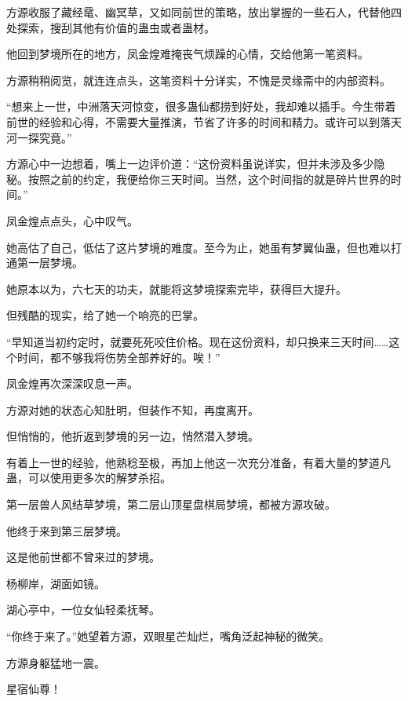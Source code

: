 \begin{this_body}
方源收服了藏经鼋、幽冥草，又如同前世的策略，放出掌握的一些石人，代替他四处探索，搜刮其他有价值的蛊虫或者蛊材。

他回到梦境所在的地方，凤金煌难掩丧气烦躁的心情，交给他第一笔资料。

方源稍稍阅览，就连连点头，这笔资料十分详实，不愧是灵缘斋中的内部资料。

“想来上一世，中洲落天河惊变，很多蛊仙都捞到好处，我却难以插手。今生带着前世的经验和心得，不需要大量推演，节省了许多的时间和精力。或许可以到落天河一探究竟。”

方源心中一边想着，嘴上一边评价道：“这份资料虽说详实，但并未涉及多少隐秘。按照之前的约定，我便给你三天时间。当然，这个时间指的就是碎片世界的时间。”

凤金煌点点头，心中叹气。

她高估了自己，低估了这片梦境的难度。至今为止，她虽有梦翼仙蛊，但也难以打通第一层梦境。

她原本以为，六七天的功夫，就能将这梦境探索完毕，获得巨大提升。

但残酷的现实，给了她一个响亮的巴掌。

“早知道当初约定时，就要死死咬住价格。现在这份资料，却只换来三天时间……这个时间，都不够我将伤势全部养好的。唉！”

凤金煌再次深深叹息一声。

方源对她的状态心知肚明，但装作不知，再度离开。

但悄悄的，他折返到梦境的另一边，悄然潜入梦境。

有着上一世的经验，他熟稔至极，再加上他这一次充分准备，有着大量的梦道凡蛊，可以使用更多次的解梦杀招。

第一层兽人风结草梦境，第二层山顶星盘棋局梦境，都被方源攻破。

他终于来到第三层梦境。

这是他前世都不曾来过的梦境。

杨柳岸，湖面如镜。

湖心亭中，一位女仙轻柔抚琴。

“你终于来了。”她望着方源，双眼星芒灿烂，嘴角泛起神秘的微笑。

方源身躯猛地一震。

星宿仙尊！

\end{this_body}

